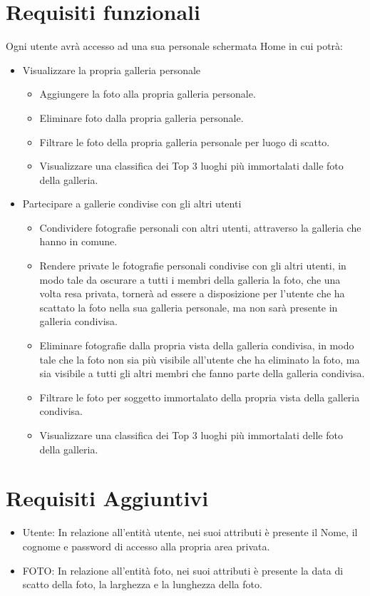 \section{Requisiti funzionali}
Ogni utente avrà accesso ad una sua personale schermata Home in cui potrà:
\begin{itemize}
    \item Visualizzare la propria galleria personale
        \begin{itemize}
            \item Aggiungere la foto alla propria galleria personale.
            \item Eliminare foto dalla propria galleria personale.
            \item Filtrare le foto della propria galleria personale per luogo di scatto.
            \item Visualizzare una classifica dei Top 3 luoghi più immortalati dalle foto della galleria.
        \end{itemize}
    \item Partecipare a gallerie condivise con gli altri utenti
        \begin{itemize}
            \item Condividere fotografie personali con altri utenti, attraverso la galleria che hanno in comune.
            \item Rendere private le fotografie personali condivise con gli altri utenti, in
            modo tale da oscurare a tutti i membri della galleria la foto, che una volta resa privata, tornerà ad essere a disposizione per l’utente che ha scattato la foto nella sua galleria personale, ma non sarà presente in galleria condivisa.
            \item Eliminare fotografie dalla propria vista della galleria condivisa, in modo tale che la foto non sia più visibile all’utente che ha eliminato la foto, ma sia visibile a tutti gli altri membri che fanno parte della galleria condivisa.
            \item Filtrare le foto per soggetto immortalato della propria vista della galleria condivisa.
            \item Visualizzare una classifica dei Top 3 luoghi più immortalati delle foto della galleria.
        \end{itemize}
\end{itemize}

\section{Requisiti Aggiuntivi}
\begin{itemize}
    \item Utente: In relazione all’entità utente, nei suoi attributi è presente il Nome, il cognome e password di accesso alla propria area privata.
    \item FOTO: In relazione all’entità foto, nei suoi attributi è presente la data di scatto della foto, la larghezza e la lunghezza della foto.
\end{itemize}